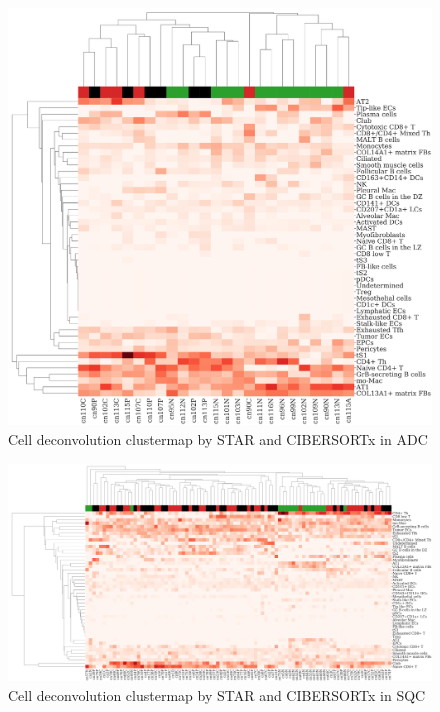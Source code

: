 \documentclass[11pt,a4paper,onecolumn,oneside]{report}
\begin{document}
                \begin{figure}[p]
                    \centering
                    \includegraphics[width=0.6 \linewidth]{figures/CIBERSORTx/clustermap/STAR.ADC.cluster.pdf}
                    \caption{Cell deconvolution clustermap by STAR and CIBERSORTx in ADC}
                    \label{fig:Deconvolution-CIBERSORTx-STAR-cluster-ADC}
                \end{figure}

                \begin{figure}[p]
                    \centering
                    \includegraphics[width=\linewidth]{figures/CIBERSORTx/clustermap/STAR.SQC.cluster.pdf}
                    \caption{Cell deconvolution clustermap by STAR and CIBERSORTx in SQC}
                    \label{fig:Deconvolution-CIBERSORTx-STAR-cluster-SQC}
                \end{figure}
\end{document}
